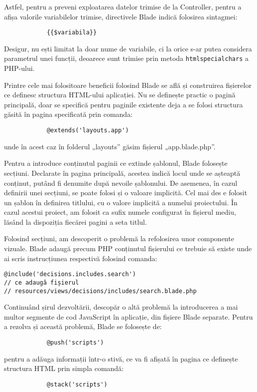 		Astfel, pentru a preveni exploatarea datelor trimise de la Controller, pentru a afișa valorile variabilelor trimise, directivele Blade indică folosirea sintagmei:
			\begin{Verbatim}
			{{$variabila}}
			\end{Verbatim}

		Desigur, nu ești limitat la doar nume de variabile, ci la orice s-ar putea considera parametrul unei funcții, deoarece sunt trimise prin metoda \verb|htmlspecialchars| a PHP-ului.

		Printre cele mai folositoare beneficii folosind Blade se află și construirea fișierelor ce definesc structura HTML-ului aplicației.
		Nu se definește practic o pagină principală, doar se specifică pentru paginile existente deja a se folosi structura găsită în pagina specificată prin comanda:
		\begin{Verbatim}
			@extends('layouts.app')
		\end{Verbatim}
		unde în acest caz în folderul „layouts” găsim fișierul „app.blade.php”.

		Pentru a introduce conținutul paginii ce extinde șablonul, Blade folosește secțiuni.
		Declarate în pagina principală, acestea indică locul unde se așteaptă conținut, putând fi denumite după nevoile șablonului.
		De asemenea, în cazul definirii unei secțiuni, se poate folosi și o valoare implicită.
		Cel mai des e folosit un șablon în definirea titlului, cu o valore implicită a numelui proiectului.
		În cazul acestui proiect, am folosit ca sufix numele configurat în fișierul mediu, lăsând la dispoziția fiecărei pagini a seta titlul.

		Folosind secțiuni, am descoperit o problemă la refolosirea unor componente vizuale.
		Blade adaugă precum PHP conținutul fișierului ce trebuie să existe unde ai scris instrucțiunea respectivă folosind comanda:
		\begin{Verbatim}
@include('decisions.includes.search')
// ce adaugă fișierul
// resources/views/decisions/includes/search.blade.php
		\end{Verbatim}

		Continuând șirul dezvoltării, descopăr o altă problemă la introducerea a mai multor segmente de cod JavaScript în aplicație, din fișiere Blade separate.
		Pentru a rezolva și această problemă, Blade se folosește de:
		\begin{Verbatim}
			@push('scripts')
		\end{Verbatim}
		pentru a adăuga informații într-o stivă, ce va fi afișată în pagina ce definește structura HTML prin simpla comandă:
		\begin{Verbatim}
			@stack('scripts')
		\end{Verbatim}

